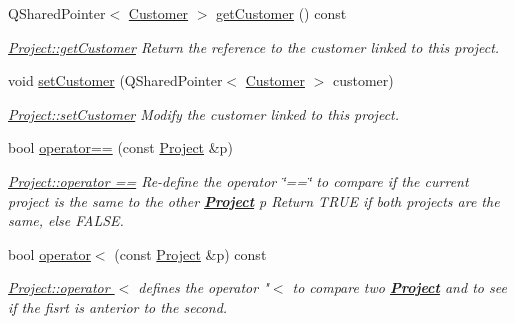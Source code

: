 \begin{DoxyCompactItemize}
Q\-Shared\-Pointer$<$ \hyperlink{classModels_1_1Customer}{Customer} $>$ \hyperlink{classModels_1_1Project_ad15f442a24c9d42144b73f27a7afaa35}{get\-Customer} () const 
\begin{DoxyCompactList}\small\item\em \hyperlink{classModels_1_1Project_ad15f442a24c9d42144b73f27a7afaa35}{Project\-::get\-Customer} Return the reference to the customer linked to this project. \end{DoxyCompactList}\item 
void \hyperlink{classModels_1_1Project_a9d305edf054735b911e144516d3eccba}{set\-Customer} (Q\-Shared\-Pointer$<$ \hyperlink{classModels_1_1Customer}{Customer} $>$ customer)
\begin{DoxyCompactList}\small\item\em \hyperlink{classModels_1_1Project_a9d305edf054735b911e144516d3eccba}{Project\-::set\-Customer} Modify the {\itshape customer} linked to this project. \end{DoxyCompactList}\item 
bool \hyperlink{classModels_1_1Project_a2f322e63f6b42273c24093b9df46c2d6}{operator==} (const \hyperlink{classModels_1_1Project}{Project} \&p)
\begin{DoxyCompactList}\small\item\em \hyperlink{classModels_1_1Project_a2f322e63f6b42273c24093b9df46c2d6}{Project\-::operator ==} Re-\/define the operator \char`\"{}==\char`\"{} to compare if the current project is the same to the other {\bfseries \hyperlink{classModels_1_1Project}{Project}} {\itshape p} Return T\-R\-U\-E if both projects are the same, else F\-A\-L\-S\-E. \end{DoxyCompactList}\item 
bool \hyperlink{classModels_1_1Project_a8e7cc264d433c708323faccae7bdd082}{operator$<$} (const \hyperlink{classModels_1_1Project}{Project} \&p) const 
\begin{DoxyCompactList}\small\item\em \hyperlink{classModels_1_1Project_a8e7cc264d433c708323faccae7bdd082}{Project\-::operator $<$} defines the operator "$<$ to compare two {\bfseries \hyperlink{classModels_1_1Project}{Project}} and to see if the fisrt is anterior to the second. \end{DoxyCompactList}\end{DoxyCompactItemize}
